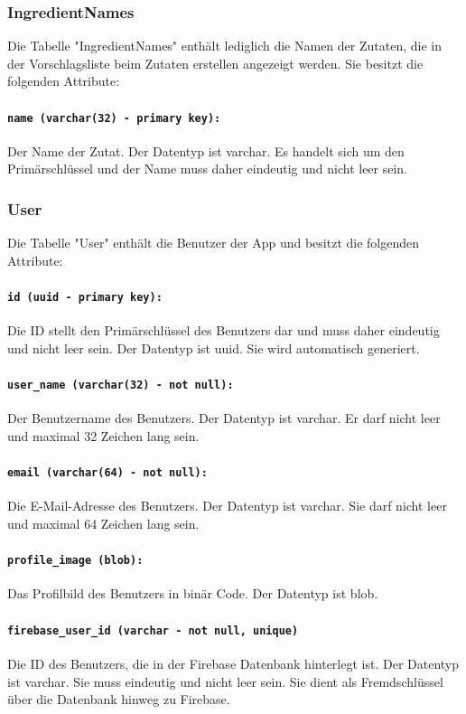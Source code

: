 \documentclass{entwurfsheft}
\begin{document}
\subsubsection{IngredientNames}
Die Tabelle "IngredientNames" enthält lediglich die Namen der Zutaten, die in der Vorschlagsliste beim Zutaten erstellen angezeigt werden. Sie besitzt die folgenden Attribute:
\paragraph{\texttt{name (varchar(32) - primary key):}} Der Name der Zutat. Der Datentyp ist \Gls{varchar}. Es handelt sich um den Primärschlüssel und der Name muss daher eindeutig und nicht leer sein.
\newpage
\subsubsection{User}
Die Tabelle "User" enthält die Benutzer der App und besitzt die folgenden Attribute:
\paragraph{\texttt{id (uuid - primary key):}} Die ID stellt den Primärschlüssel des Benutzers dar und muss daher eindeutig und nicht leer sein. Der Datentyp ist \Gls{uuid}. Sie wird automatisch generiert.
\paragraph{\texttt{user\_name (varchar(32) - not null):}} Der Benutzername des Benutzers. Der Datentyp ist \Gls{varchar}. Er darf nicht leer und maximal 32 Zeichen lang sein.
\paragraph{\texttt{email (varchar(64) - not null):}} Die E-Mail-Adresse des Benutzers. Der Datentyp ist \Gls{varchar}. Sie darf nicht leer und maximal 64 Zeichen lang sein.
\paragraph{\texttt{profile\_image (blob):}} Das Profilbild des Benutzers in binär Code. Der Datentyp ist \Gls{blob}.
\paragraph{\texttt{firebase\_user\_id (varchar - not null, unique)}} Die ID des Benutzers, die in der Firebase Datenbank hinterlegt ist. Der Datentyp ist \Gls{varchar}. Sie muss eindeutig und nicht leer sein. Sie dient als Fremdschlüssel über die Datenbank hinweg zu Firebase.
\newpage
\end{document}
